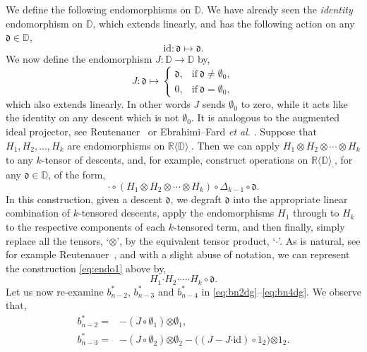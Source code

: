 \documentclass[5p,twocolumn]{elsarticle}
\newcommand*{\id}{{\mathrm{id}}}
\newcommand*{\R}{\mathbb R}
\newcommand*{\df}{\mathfrak d}
\newcommand*{\cendot}{\boldsymbol{\cdot}}
\newcommand*{\botimes}{\boldsymbol{\otimes}}
\begin{document}
We define the following endomorphisms on $\mathbb D$. We have already seen the \emph{identity}
endomorphism on $\mathbb D$, which extends linearly, and has the following action on any $\df\in\mathbb D$,
\begin{equation*}
    \id\colon\df\mapsto\df.
\end{equation*}
We now define the endomorphism $J\colon\mathbb D\to\mathbb D$ by,
\begin{equation*}
    J\colon\df\mapsto\begin{cases} \df, & \text{if}~ \df\neq\emptyset_0,\\ 0, & \text{if}~ \df=\emptyset_0, \end{cases}
\end{equation*}
which also extends linearly.
In other words $J$ sends $\emptyset_0$ to zero, while it acts like the identity on any descent which is not $\emptyset_0$.
It is analogous to the augmented ideal projector, see Reutenauer~\cite{Reutenauer} or Ebrahimi--Fard \textit{et al.}\/ \cite{E-FLMM-KW}.
Suppose that $H_1,H_2,\ldots,H_k$ are endomorphisms on $\R\langle\mathbb D\rangle_{\cendot}$.
Then we can apply $H_1\otimes H_2\otimes\cdots\otimes H_k$ to any $k$-tensor of descents,
and, for example, construct operations on $\R\langle\mathbb D\rangle_{\cendot}$, for any $\df\in\mathbb D$, of the form,
\begin{equation}\label{eq:endo1}
\cendot\circ(H_1\otimes H_2\otimes\cdots\otimes H_k)\circ\Delta_{k-1}\circ\df.
\end{equation}
In this construction, given a descent $\df$, we degraft $\df$ into the appropriate linear combination of $k$-tensored descents,
apply the endomorphisms $H_1$ through to $H_k$ to the respective components of each $k$-tensored term, and then finally, simply
replace all the tensors, `$\otimes$', by the equivalent tensor product, `$\cendot$'.
As is natural, see for example Reutenauer~\cite{Reutenauer}, and with a slight abuse of notation, we can represent the construction \eqref{eq:endo1} above by,
\begin{equation}\label{eq:endo2}
H_1\cendot H_2\cendot\cdots\cendot H_k\circ\df.
\end{equation}
Let us now re-examine $b^\ast_{n-2}$, $b^\ast_{n-3}$ and $b^\ast_{n-4}$ in \eqref{eq:bn2dg}--\eqref{eq:bn4dg}.
We observe that,
\begin{align*}
  b^\ast_{n-2}=&-(J\circ\emptyset_1)\botimes\emptyset_1,\\
  b^\ast_{n-3}=&-(J\circ\emptyset_2)\botimes\emptyset_2-\bigl((J-J\cendot\id)\circ 1_2\bigr)\botimes1_2.
\end{align*}
\end{document}
